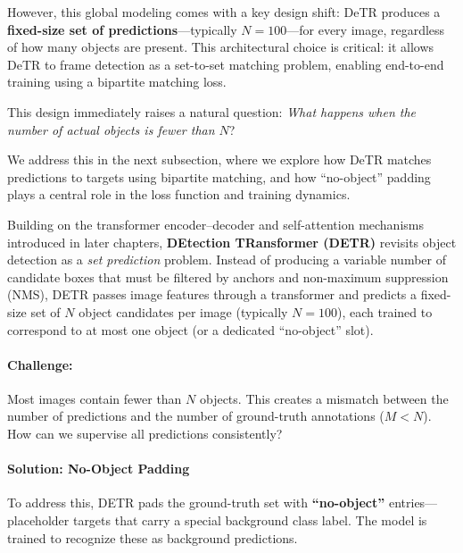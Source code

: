 \begin{enrichment}
	\noindent
	However, this global modeling comes with a key design shift: DeTR produces a \textbf{fixed-size set of predictions}—typically \(N = 100\)—for every image, regardless of how many objects are present. This architectural choice is critical: it allows DeTR to frame detection as a set-to-set matching problem, enabling end-to-end training using a bipartite matching loss.
	
	\noindent
	This design immediately raises a natural question: \emph{What happens when the number of actual objects is fewer than \(N\)}?
	
	\noindent
	We address this in the next subsection, where we explore how DeTR matches predictions to targets using bipartite matching, and how “no-object” padding plays a central role in the loss function and training dynamics.
	
	\newpage
	
	\begin{enrichment}
		\label{enr:chapter14_detr_matching}
		
		\noindent
		Building on the transformer encoder–decoder and self-attention mechanisms introduced in later chapters, \textbf{DEtection TRansformer (DETR)} \cite{carion2020_detr} revisits object detection as a \emph{set prediction} problem. Instead of producing a variable number of candidate boxes that must be filtered by anchors and non-maximum suppression (NMS), DETR passes image features through a transformer and predicts a fixed-size set of \(N\) object candidates per image (typically \(N = 100\)), each trained to correspond to at most one object (or a dedicated “no-object” slot).
		
		\paragraph{Challenge:}
		Most images contain fewer than \(N\) objects. This creates a mismatch between the number of predictions and the number of ground-truth annotations (\(M < N\)). How can we supervise all predictions consistently?
		
		\paragraph{Solution: No-Object Padding}
		To address this, DETR pads the ground-truth set with \textbf{“no-object”} entries—placeholder targets that carry a special background class label. The model is trained to recognize these as background predictions.
		

\end{enrichment}
\end{enrichment}
